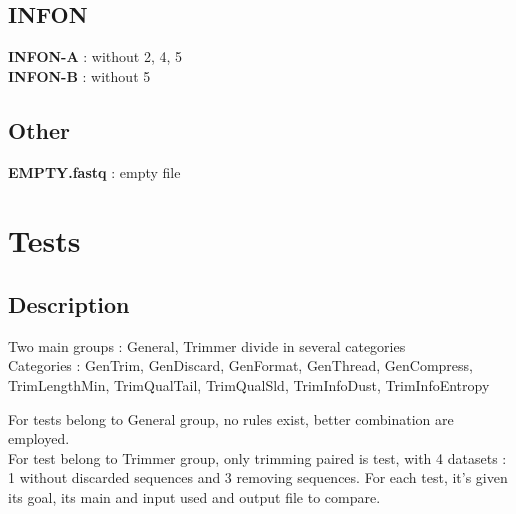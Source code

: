 \documentclass{article}
\begin{document}
\subsection{INFON}
\textbf{INFON-A} : without 2, 4, 5\\
\textbf{INFON-B} : without 5\\

\subsection{Other}
\textbf{EMPTY.fastq} : empty file

\section{Tests}
\subsection{Description}
Two main groups : General, Trimmer divide in several categories\\
Categories : GenTrim, GenDiscard, GenFormat, GenThread, GenCompress, TrimLengthMin, TrimQualTail, TrimQualSld, TrimInfoDust, TrimInfoEntropy\par

For tests belong to General group, no rules exist, better combination are employed.\\
For test belong to Trimmer group, only trimming paired is test, with 4 datasets : 1 without discarded sequences and 3 removing sequences.
For each test, it's given its goal, its main and input used and output file to compare.
\end{document}
